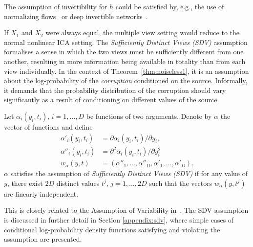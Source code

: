 The assumption of invertibility for $h$ could be satisfied by, e.g., the use of normalizing flows~\citep{rezende2015variational, chen2018neural} or deep invertible networks~\citep{jacobsen_hal-01712808}.


If $X_1$ and $X_2$ were always equal, the multiple view setting would reduce to the normal nonlinear ICA setting.
The \emph{Sufficiently Distinct Views (SDV)} assumption formalises a sense in which the two views must be sufficiently different from one another,
resulting in more information being available in totality than from each view individually.
In the context of Theorem~\ref{thm:noiseless1}, it is an assumption about the log-probability of the \emph{corruption} conditioned on the source.
Informally, it demands that the probability distribution of the corruption should vary significantly as a result of conditioning on different values of the source.

\medskip

\begin{definition}\label{suff_dist_assumption}
	Let $\alpha_i(y_i, t_i)$, $i=1,\ldots, D$ be functions of two arguments.
	Denote by $\alpha$ the vector of functions and define
	\begin{align}
	\alpha'_{i}(y_i, t_i)&= \partial \alpha_{i}(y_i, t_i)/\partial y_i, \label{eq:convention1}\\
	\alpha''_{i}(y_i, t_i)&=\partial^2 \alpha_{i}(y_i, t_i)/\partial y_i^2\, \label{eq:convention2}\\
	{w}_{\alpha}({y}, {t}) &= (\alpha''_{1}, \ldots, \alpha''_{D}, \alpha'_{1}, \ldots,\alpha'_{D}).
	\end{align}
	${\alpha}$ satisfies the assumption of \emph{Sufficiently Distinct Views (SDV)} if for any value of ${y}$, there exist $2D$ distinct values ${t}^j$, $j=1, \ldots, 2D$ such that the vectors ${w_\alpha}({y},{t}^j)$ are linearly independent.
	\\    \end{definition}
This is closely related to the Assumption of Variability in~\cite{hyvarinen19a}.
The SDV assumption is discussed in further detail in Section \ref{appendix:sdv}, where simple cases of conditional log-probability density functions satisfying and violating the assumption are presented.



